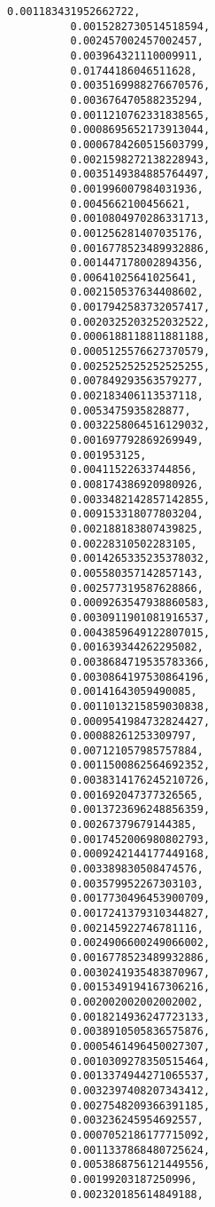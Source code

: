 \documentclass[11pt]{article}
\begin{document}
\begin{Verbatim}[commandchars=\\\{\}]
          0.001183431952662722,
          0.0015282730514518594,
          0.002457002457002457,
          0.003964321110009911,
          0.01744186046511628,
          0.0035169988276670576,
          0.003676470588235294,
          0.0011210762331838565,
          0.0008695652173913044,
          0.0006784260515603799,
          0.0021598272138228943,
          0.0035149384885764497,
          0.001996007984031936,
          0.0045662100456621,
          0.0010804970286331713,
          0.001256281407035176,
          0.0016778523489932886,
          0.001447178002894356,
          0.00641025641025641,
          0.002150537634408602,
          0.0017942583732057417,
          0.0020325203252032522,
          0.0006188118811881188,
          0.0005125576627370579,
          0.0025252525252525255,
          0.007849293563579277,
          0.002183406113537118,
          0.0053475935828877,
          0.0032258064516129032,
          0.001697792869269949,
          0.001953125,
          0.00411522633744856,
          0.008174386920980926,
          0.0033482142857142855,
          0.009153318077803204,
          0.002188183807439825,
          0.00228310502283105,
          0.0014265335235378032,
          0.005580357142857143,
          0.002577319587628866,
          0.0009263547938860583,
          0.0030911901081916537,
          0.0043859649122807015,
          0.001639344262295082,
          0.0038684719535783366,
          0.0030864197530864196,
          0.00141643059490085,
          0.0011013215859030838,
          0.0009541984732824427,
          0.00088261253309797,
          0.007121057985757884,
          0.0011500862564692352,
          0.0038314176245210726,
          0.001692047377326565,
          0.0013723696248856359,
          0.00267379679144385,
          0.0017452006980802793,
          0.0009242144177449168,
          0.003389830508474576,
          0.003579952267303103,
          0.0017730496453900709,
          0.0017241379310344827,
          0.002145922746781116,
          0.0024906600249066002,
          0.0016778523489932886,
          0.0030241935483870967,
          0.0015349194167306216,
          0.002002002002002002,
          0.0018214936247723133,
          0.0038910505836575876,
          0.0005461496450027307,
          0.0010309278350515464,
          0.0013374944271065537,
          0.0032397408207343412,
          0.0027548209366391185,
          0.003236245954692557,
          0.0007052186177715092,
          0.0011337868480725624,
          0.0053868756121449556,
          0.00199203187250996,
          0.002320185614849188,

\end{Verbatim}
\end{document}
